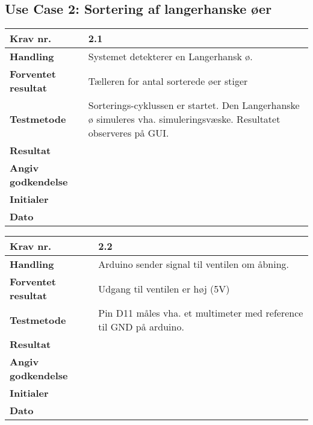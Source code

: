  \subsection{Use Case 2: Sortering af langerhanske øer}

	\begin{center}
		\begin{longtable}{ | m{4cm}| m{8.5cm}|} 
			\hline
			\textbf{Krav nr.} & 2.1  \\ 
			\hline
			\textbf{Handling} & Systemet detekterer en Langerhansk ø.  \\
			\hline
			\textbf{Forventet resultat} & Tælleren for antal sorterede øer stiger \\
			\hline
			\textbf{Testmetode}  & Sorterings-cyklussen er startet. Den Langerhanske ø simuleres vha. simuleringsvæske. Resultatet observeres på GUI.   \\
			\hline
			\textbf{Resultat}  &    \\
			\hline
			\textbf{Angiv godkendelse} &     \\
			\hline
			\textbf{Initialer} &     \\
			\hline
			\textbf{Dato} &    \\
			\hline
		\end{longtable}
	\end{center}	
	
	\begin{center}
		\begin{longtable}{ | m{4cm}| m{8.5cm}|} 
			\hline
			\textbf{Krav nr.} & 2.2  \\ 
			\hline
			\textbf{Handling} & Arduino sender signal til ventilen om åbning.  \\
			\hline
			\textbf{Forventet resultat} & Udgang til ventilen er høj (5V) \\
			\hline
			\textbf{Testmetode}  & Pin D11 måles vha. et multimeter med reference til GND på arduino.  \\
			\hline
			\textbf{Resultat}  &    \\
			\hline
			\textbf{Angiv godkendelse} &     \\
			\hline
			\textbf{Initialer} &     \\
			\hline
			\textbf{Dato} &    \\
			\hline
		\end{longtable}
	\end{center}	
	
